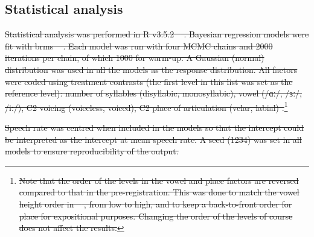 \documentclass[12pt,a4paper,]{article}
\let\rmarkdownfootnote\footnote%
\def\footnote{\protect\rmarkdownfootnote}
\providecommand{\DIFdeltex}[1]{{\protect\color{red}\sout{#1}}}                      %
\providecommand{\DIFdelbegin}{} %
\providecommand{\DIFdel}[1]{\texorpdfstring{\DIFdeltex{#1}}{}} %
\newcommand{\DIFscaledelfig}{0.5}
\newlength{\DIFdelgraphicswidth} %
\newlength{\DIFdelgraphicsheight} %
\newcommand{\DIFdelincludegraphics}[2][]{%
\sbox{\DIFdelgraphicsbox}{\DIFOincludegraphics[#1]{#2}}%
\settoboxwidth{\DIFdelgraphicswidth}{\DIFdelgraphicsbox} %
\settoboxtotalheight{\DIFdelgraphicsheight}{\DIFdelgraphicsbox} %
\scalebox{\DIFscaledelfig}{%
\parbox[b]{\DIFdelgraphicswidth}{\usebox{\DIFdelgraphicsbox}\\[-\baselineskip] \rule{\DIFdelgraphicswidth}{0em}}\llap{\resizebox{\DIFdelgraphicswidth}{\DIFdelgraphicsheight}{%
\setlength{\unitlength}{\DIFdelgraphicswidth}%
\begin{picture}(1,1)%
\thicklines\linethickness{2pt} %
{\color[rgb]{1,0,0}\put(0,0){\framebox(1,1){}}}%
{\color[rgb]{1,0,0}\put(0,0){\line( 1,1){1}}}%
{\color[rgb]{1,0,0}\put(0,1){\line(1,-1){1}}}%
\end{picture}%
}\hspace*{3pt}}} %
} %
\DeclareRobustCommand{\DIFdelbegin}{\DIFOdelbegin \let\includegraphics\DIFdelincludegraphics} %
\begin{document}
\hypertarget{statistical-analysis}{%
\subsection{Statistical analysis}\label{statistical-analysis}}

\DIFdelbegin \DIFdel{Statistical analysis was performed in R v3.5.2 \mbox{%
\citep{r-core-team2018}}\hspace{0pt}%
.
Bayesian regression models were fit with brms
\mbox{%
\citep{burkner2017, burkner2018}}\hspace{0pt}%
. Each model was run with four MCMC
chains and 2000 iterations per chain, of
which 1000 for warm-up. A
Gaussian (normal) distribution was used in all the
models as the
response distribution. All factors were coded using treatment contrasts
(the first level in this list was set as the reference level): number of syllables (disyllabic, monosyllabic), vowel (/ɑː/, /ɜː/, /iː/), C2
voicing (voiceless, voiced), C2 place of articulation (velar, labial) .}\footnote{\DIFdel{Note that the order of the levels in the vowel and place factors are reversed compared to that in the pre-registration. This was done to match the vowel height order in \mbox{%
\citet{coretta2018j}}\hspace{0pt}%
, from low to high, and to keep a back-to-front order for place for expositional purposes. Changing the order of the levels of course does not affect the results.}}
\addtocounter{footnote}{-1}%
\DIFdel{Speech rate was centred when included in the models so that the
intercept could be interpreted as the intercept at mean speech rate. A
seed (1234) was set in all models to ensure reproducibility of the
output.
}%
\end{document}
